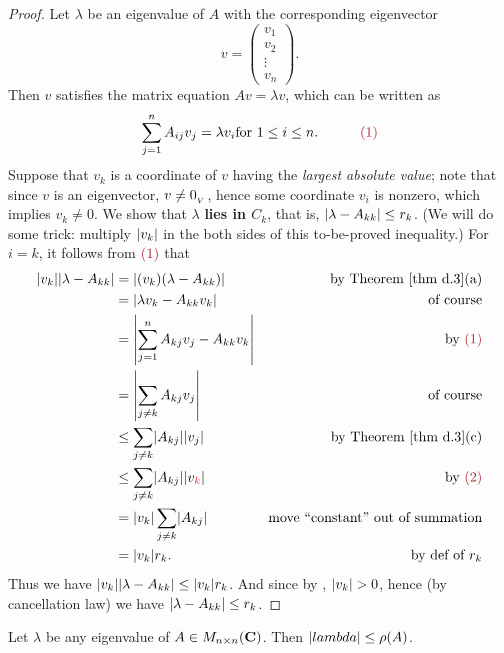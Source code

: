 \begin{proof}
Let \(\lambda\) be an eigenvalue of \(A\) with the corresponding eigenvector
\[
    v = \begin{pmatrix} v_1 \\ v_2 \\ \vdots \\ v_n \end{pmatrix}.
\]
Then \(v\) satisfies the matrix equation \(Av = \lambda v\), which can be written as
\[
    \sum_{j = 1}^n A_{ij} v_j = \lambda v_i \text{for \(1 \le i \le n\)}. \quad \quad \quad \MAROON{(1)}
\]
Suppose that \(v_k\) is a coordinate of \(v\) having the \emph{largest absolute value};  \quad \quad
note that since \(v\) is an eigenvector, \(v \ne 0_{_V}\), hence some coordinate \(v_i\) is nonzero, which implies \(v_k \ne 0\).  \quad \quad
We show that \(\lambda\) \textbf{lies in \(C_k\)}, that is, \(\lvert\lambda - A_{kk}\rvert \le r_k\).
(We will do some trick: multiply \(\lvert v_k\rvert\) in the both sides of this to-be-proved inequality.)
For \(i = k\), it follows from \(\MAROON{(1)}\) that
\begin{align*}
    \abs{v_k}\abs{\lambda - A_{kk}} & = \abs{(v_k)(\lambda - A_{kk})} & \text{by \THM{d.3}(a)} \\
        & = \abs{\lambda v_k - A_{kk} v_k} & \text{of course} \\
        & = \left| \sum_{j = 1}^n A_{kj} v_j - A_{kk} v_k \right| & \text{by \MAROON{(1)}} \\
        & = \left| \sum_{j \ne k} A_{kj} v_j \right| & \text{of course} \\
        & \le \sum_{j \ne k} \abs{ A_{kj} } \abs{ v_j } & \text{by \THM{d.3}(c)} \\
        & \le \sum_{j \ne k} \abs{ A_{kj} } \abs{ v_{\RED{k}} } & \text{by \MAROON{(2)}} \\
        & = \abs{v_k} \sum_{j \ne k} \abs { A_{kj} } & \text{move ``constant'' out of summation} \\
        & = \abs{v_k} r_k. & \text{by def of \(r_k\)}
\end{align*}
Thus we have \(\lvert v_k\rvert\lvert\lambda - A_{kk}\rvert \le \lvert v_k\rvert r_k\).
And since by , \(\lvert v_k\rvert > 0\), hence (by cancellation law) we have \(\lvert\lambda - A_{kk}\rvert \le r_k\).
\end{proof}

\begin{corollary} \label{corollary 5.15.1}
Let \(\lambda\) be any eigenvalue of \(A \in M_{n \times n}(\mathbf{C})\).
Then \(\lvert lambda\rvert \le \rho(A)\).
\end{corollary}

